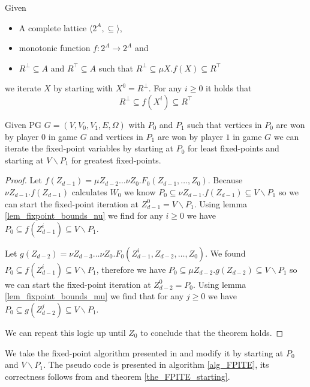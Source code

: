 \begin{lemma}
	\label{lem_fixpoint_bounds_mu}
	Given
	\begin{itemize}
		\item A complete lattice $\langle 2^A, \subseteq \rangle$,
		\item monotonic function $f : 2^A \rightarrow 2^A$ and
		\item $R^\bot \subseteq A$ and $R^\top \subseteq A$ such that $R^\bot \subseteq \mu X. f(X) \subseteq R^\top$
	\end{itemize}
	we iterate $X$ by starting with $X^0 = R^\bot$. For any $i \geq 0$ it holds that
	\[ R^\bot \subseteq f(X^i) \subseteq R^\top \]
\end{lemma}

\begin{theorem}
	\label{the_FPITE_starting}
	Given PG $G = (V,V_0,V_1,E,\Omega)$ with $P_0$ and $P_1$ such that vertices  in $P_0$ are won by player $0$ in game $G$ and vertices in $P_1$ are won by player $1$ in game $G$ we can iterate the fixed-point variables by starting at $P_0$ for least fixed-points and starting at $V \backslash P_1$ for greatest fixed-points.
	\begin{proof}
		Let $f(Z_{d-1}) = \mu Z_{d-2}\dots\nu Z_0.F_0(Z_{d-1},\dots,Z_0)$. Because $\nu Z_{d-1}.f(Z_{d-1})$ calculates $W_0$ we know $P_0 \subseteq \nu Z_{d-1}.f(Z_{d-1}) \subseteq V \backslash P_1$ so we can start the fixed-point iteration at $Z_{d-1}^0 = V\backslash P_1$. Using lemma \ref{lem_fixpoint_bounds_nu} we find for any $i \geq 0$ we have $P_0 \subseteq f(Z_{d-1}^i) \subseteq V \backslash P_1$.
		
		Let $g(Z_{d-2}) = \nu Z_{d-3} \dots \nu Z_0. F_0(Z_{d-1}^i,Z_{d-2},\dots,Z_0)$. We found $P_0 \subseteq f(Z_{d-1}^i) \subseteq V \backslash P_1$, therefore we have $P_0 \subseteq \mu Z_{d-2}.g(Z_{d-2})\subseteq V \backslash P_1$ so we can start the fixed-point iteration at $Z_{d-2}^0 = P_0$. Using lemma \ref{lem_fixpoint_bounds_mu} we find that for any $j \geq 0$ we have $P_0 \subseteq g(Z_{d-2}^j) \subseteq V\backslash P_1$.
		
		We can repeat this logic up until $Z_0$ to conclude that the theorem holds.
	\end{proof}
\end{theorem}
We take the fixed-point algorithm presented in \cite{FPITE} and modify it by starting at $P_0$ and $V \backslash P_1$. The pseudo code is presented in algorithm \ref{alg_FPITE}, its correctness follows from \cite{FPITE} and theorem \ref{the_FPITE_starting}.
